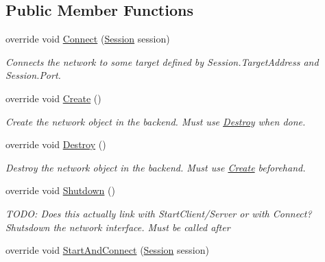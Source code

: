 \subsection*{Public Member Functions}
\begin{DoxyCompactItemize}
\item 
override void \hyperlink{class_skyrates_1_1_client_1_1_network_1_1_dummy_client_a17e6fc98bf3487cef6ed236401940427}{Connect} (\hyperlink{class_skyrates_1_1_common_1_1_network_1_1_session}{Session} session)
\begin{DoxyCompactList}\small\item\em Connects the network to some target defined by Session.\-Target\-Address and Session.\-Port. \end{DoxyCompactList}\item 
override void \hyperlink{class_skyrates_1_1_client_1_1_network_1_1_dummy_client_add9e5b4f67f124f67bda717dbc5657e2}{Create} ()
\begin{DoxyCompactList}\small\item\em Create the network object in the backend. Must use \hyperlink{class_skyrates_1_1_client_1_1_network_1_1_dummy_client_af55cf70c2bcec0b28584f2c0b0660e27}{Destroy} when done. \end{DoxyCompactList}\item 
override void \hyperlink{class_skyrates_1_1_client_1_1_network_1_1_dummy_client_af55cf70c2bcec0b28584f2c0b0660e27}{Destroy} ()
\begin{DoxyCompactList}\small\item\em Destroy the network object in the backend. Must use \hyperlink{class_skyrates_1_1_client_1_1_network_1_1_dummy_client_add9e5b4f67f124f67bda717dbc5657e2}{Create} beforehand. \end{DoxyCompactList}\item 
override void \hyperlink{class_skyrates_1_1_client_1_1_network_1_1_dummy_client_a6e2df63c9102493cacdd16c183f55916}{Shutdown} ()
\begin{DoxyCompactList}\small\item\em T\-O\-D\-O\-: Does this actually link with Start\-Client/\-Server or with Connect? Shutsdown the network interface. Must be called after \end{DoxyCompactList}\item 
\hypertarget{class_skyrates_1_1_client_1_1_network_1_1_dummy_client_a2033357a7e9e093baa015bdc234be0a3}{override void \hyperlink{class_skyrates_1_1_client_1_1_network_1_1_dummy_client_a2033357a7e9e093baa015bdc234be0a3}{Start\-And\-Connect} (\hyperlink{class_skyrates_1_1_common_1_1_network_1_1_session}{Session} session)}\label{class_skyrates_1_1_client_1_1_network_1_1_dummy_client_a2033357a7e9e093baa015bdc234be0a3}


\end{DoxyCompactItemize}
